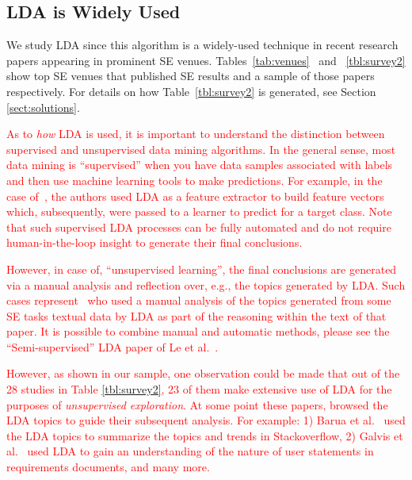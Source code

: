 \documentclass[twocolumn,5p,sort&compress]{elsarticle}
\newcommand{\tion}[1]{\ref{sect:#1}}
\theoremstyle{break}
\begin{document}


\subsection{LDA is Widely Used}

We study LDA since this algorithm
is a widely-used technique in recent research papers appearing in prominent SE venues.
Tables~\ref{tab:venues}~\cite{sun2016exploring} and ~\ref{tbl:survey2} show top SE venues that published SE results and a sample of those papers respectively. For details on how Table~\ref{tbl:survey2} is generated, see Section \tion{solutions}.

\textcolor{red}{As to {\em how} LDA is used, it is important to understand the distinction between supervised
and unsupervised data mining algorithms. In the general sense, most data mining is ``supervised'' when you have data samples associated with labels and then use machine learning tools to make predictions. For example,  in
the case of~\cite{lohar2013improving, sun2015msr4sm}, the authors used LDA as a feature extractor to build
feature vectors which, subsequently, were passed to a learner to predict for a target class. Note that such
supervised LDA processes can be fully automated and do not require human-in-the-loop insight to 
generate their final conclusions.}

\textcolor{red}{However, in case of,
``unsupervised learning'', the final conclusions are generated via a manual analysis and reflection over, e.g.,
the topics generated by LDA.  
Such cases represent~\cite{barua2014developers, hindle2012relating} who used a manual analysis of the topics generated from some SE tasks textual data by LDA as part of the reasoning within the
 text of that paper. It is possible to combine manual and automatic methods, please see the ``Semi-supervised''
 LDA paper of Le et al.~\cite{le2014predicting}.}

\textcolor{red}{However, as shown in our sample, one observation could be made that out of the 28 studies in Table \ref{tbl:survey2}, 23 of them make extensive
use of LDA for the purposes of {\em unsupervised exploration}. At some point these papers, browsed the LDA topics to guide their subsequent analysis. For example: 1) Barua et al.~\cite{barua2014developers} used the LDA topics to summarize the topics and trends in Stackoverflow, 2) Galvis et al.~\cite{galvis2013analysis} used LDA to gain an understanding of the nature of user statements in requirements documents, and many more.}
\end{document}
